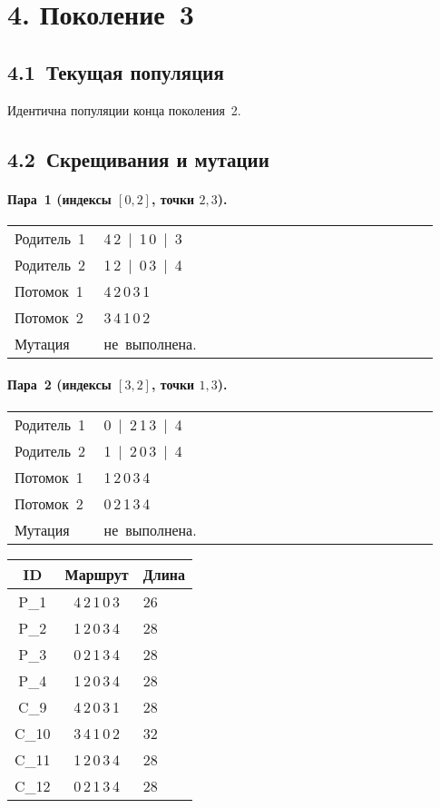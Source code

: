 \documentclass[a4paper,12pt]{article}
\begin{document}
\section*{4. Поколение 3}

\subsection*{4.1 Текущая популяция}

Идентична популяции конца поколения 2.

\subsection*{4.2 Скрещивания и мутации}

\paragraph{Пара 1 (индексы $[0,2]$, точки $2,3$).}
\begin{longtable}{@{}p{0.18\linewidth}p{0.75\linewidth}@{}}
Родитель 1 & 4\,2 \,|\, 1\,0 \,|\, 3\\
Родитель 2 & 1\,2 \,|\, 0\,3 \,|\, 4\\
Потомок 1  & 4\,2\,0\,3\,1\\
Потомок 2  & 3\,4\,1\,0\,2\\
Мутация    & не выполнена.\\
\end{longtable}

\paragraph{Пара 2 (индексы $[3,2]$, точки $1,3$).}
\begin{longtable}{@{}p{0.18\linewidth}p{0.75\linewidth}@{}}
Родитель 1 & 0 \,|\, 2\,1\,3 \,|\, 4\\
Родитель 2 & 1 \,|\, 2\,0\,3 \,|\, 4\\
Потомок 1  & 1\,2\,0\,3\,4\\
Потомок 2  & 0\,2\,1\,3\,4\\
Мутация    & не выполнена.\\
\end{longtable}

\begin{center}
\begin{tabular}{>{\ttfamily}ccl}
\toprule
ID & Маршрут & Длина\\\midrule
P\_1 & 4\,2\,1\,0\,3 & 26\\
P\_2 & 1\,2\,0\,3\,4 & 28\\
P\_3 & 0\,2\,1\,3\,4 & 28\\
P\_4 & 1\,2\,0\,3\,4 & 28\\ \midrule
C\_9  & 4\,2\,0\,3\,1 & 28\\
C\_{10} & 3\,4\,1\,0\,2 & 32\\
C\_{11} & 1\,2\,0\,3\,4 & 28\\
C\_{12} & 0\,2\,1\,3\,4 & 28\\
\bottomrule
\end{tabular}
\end{center}
\end{document}
